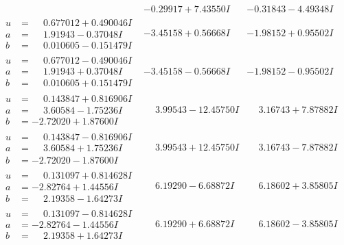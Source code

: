 \documentclass[1p]{elsarticle_modified}
\theoremstyle{definition}
\begin{document}
$$\begin{array}{c|c|c}
 & -0.29917 + 7.43550 I & -0.31843 - 4.49348 I \\ \hline\begin{aligned}
u &= \phantom{-}0.677012 + 0.490046 I \\
a &= \phantom{-}1.91943 - 0.37048 I \\
b &= \phantom{-}0.010605 - 0.151479 I\end{aligned}
 & -3.45158 + 0.56668 I & -1.98152 + 0.95502 I \\ \hline\begin{aligned}
u &= \phantom{-}0.677012 - 0.490046 I \\
a &= \phantom{-}1.91943 + 0.37048 I \\
b &= \phantom{-}0.010605 + 0.151479 I\end{aligned}
 & -3.45158 - 0.56668 I & -1.98152 - 0.95502 I \\ \hline\begin{aligned}
u &= \phantom{-}0.143847 + 0.816906 I \\
a &= \phantom{-}3.60584 - 1.75236 I \\
b &= -2.72020 + 1.87600 I\end{aligned}
 & \phantom{-}3.99543 - 12.45750 I & \phantom{-}3.16743 + 7.87882 I \\ \hline\begin{aligned}
u &= \phantom{-}0.143847 - 0.816906 I \\
a &= \phantom{-}3.60584 + 1.75236 I \\
b &= -2.72020 - 1.87600 I\end{aligned}
 & \phantom{-}3.99543 + 12.45750 I & \phantom{-}3.16743 - 7.87882 I \\ \hline\begin{aligned}
u &= \phantom{-}0.131097 + 0.814628 I \\
a &= -2.82764 + 1.44556 I \\
b &= \phantom{-}2.19358 - 1.64273 I\end{aligned}
 & \phantom{-}6.19290 - 6.68872 I & \phantom{-}6.18602 + 3.85805 I \\ \hline\begin{aligned}
u &= \phantom{-}0.131097 - 0.814628 I \\
a &= -2.82764 - 1.44556 I \\
b &= \phantom{-}2.19358 + 1.64273 I\end{aligned}
 & \phantom{-}6.19290 + 6.68872 I & \phantom{-}6.18602 - 3.85805 I \\ \hline\begin{aligned}

\end{aligned}
\end{array}$$
\end{document}
